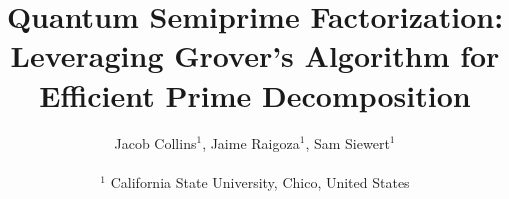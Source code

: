 \documentclass[twocolumn]{cinc}
\begin{document}


\title{Quantum Semiprime Factorization: Leveraging Grover's Algorithm for Efficient Prime Decomposition}


\author{Jacob Collins$^{1}$, Jaime Raigoza$^{1}$, Sam Siewert$^{1}$ \\
\ \\ %
 $^1$ California State University, Chico, United States}

\maketitle
\end{document}
